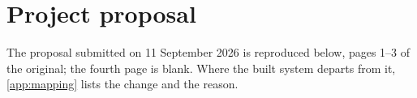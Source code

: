 \chapter{Project proposal}
\label{app:proposal}

The proposal submitted on 11 September 2026 is reproduced below, pages 1--3 of the original; the fourth page is blank. Where the built system departs from it, \cref{app:mapping} lists the change and the reason.


